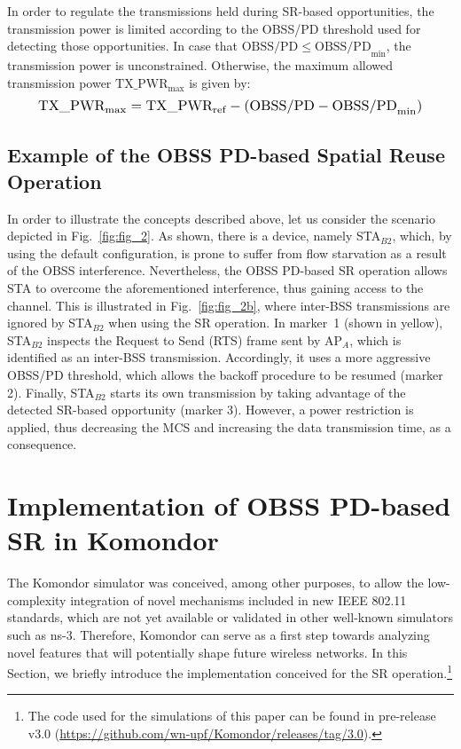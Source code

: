 \documentclass{article}
\begin{document}
	In order to regulate the transmissions held during SR-based opportunities, the transmission power is limited according to the OBSS/PD threshold used for detecting those opportunities. In case that $\text{OBSS/PD} \leq \text{OBSS/PD}_{\min}$, the transmission power is unconstrained. Otherwise, the maximum allowed transmission power $\text{TX\_PWR}_{\max}$ is given by:
	\begin{equation}
	\resizebox{.9\columnwidth}{!}{$\text{TX\_PWR}_{\max} = \text{TX\_PWR}_{\text{ref}} - (\text{OBSS/PD} -\text{OBSS/PD}_{\min})$}
	\label{eq:power_restriction}
	\end{equation}
		
	\subsection{Example of the OBSS PD-based Spatial Reuse Operation}

	In order to illustrate the concepts described above, let us consider the scenario depicted in Fig.~\ref{fig:fig_2}. As shown, there is a device, namely STA$_{B2}$, which, by using the default configuration, is prone to suffer from flow starvation as a result of the OBSS interference. Nevertheless, the OBSS PD-based SR operation allows STA to overcome the aforementioned interference, thus gaining access to the channel. This is illustrated in Fig.~\ref{fig:fig_2b}, where inter-BSS transmissions are ignored by STA$_{B2}$ when using the SR operation. In marker~1 (shown in yellow), STA$_{B2}$ inspects the Request to Send (RTS) frame sent by AP$_A$, which is identified as an inter-BSS transmission. Accordingly, it uses a more aggressive OBSS/PD threshold, which allows the backoff procedure to be resumed (marker 2). Finally, STA$_{B2}$ starts its own transmission by taking advantage of the detected SR-based opportunity (marker 3). However, a power restriction is applied, thus decreasing the MCS and increasing the data transmission time, as a consequence.
	
	\section{Implementation of OBSS PD-based SR in Komondor}
	\label{section:komondor}
	
	The Komondor simulator was conceived, among other purposes, to allow the low-complexity integration of novel mechanisms included in new IEEE 802.11 standards, which are not yet available or validated in other well-known simulators such as ns-3. Therefore, Komondor can serve as a first step towards analyzing novel features that will potentially shape future wireless networks. In this Section, we briefly introduce the implementation conceived for the SR operation.\footnote{The code used for the simulations of this paper can be found in pre-release v3.0 (\url{https://github.com/wn-upf/Komondor/releases/tag/3.0}).}
	
\end{document}
